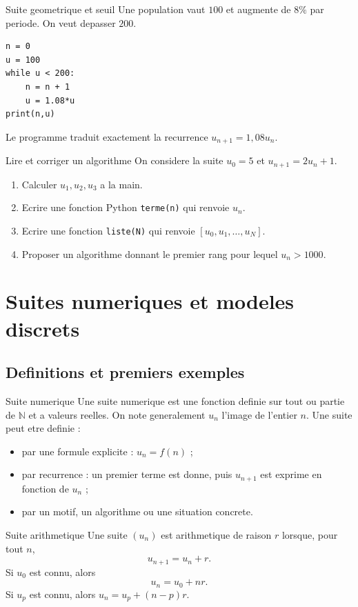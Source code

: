 \documentclass[11pt,a4paper]{article}
\newcounter{corrige}
\newcommand{\N}{\mathbb{N}}
\begin{document}
\begin{boiteexemple}{Suite geometrique et seuil}
Une population vaut $100$ et augmente de $8\%$ par periode. On veut depasser $200$.
\begin{verbatim}
n = 0
u = 100
while u < 200:
    n = n + 1
    u = 1.08*u
print(n,u)
\end{verbatim}
Le programme traduit exactement la recurrence $u_{n+1}=1,08u_n$.
\end{boiteexemple}

\begin{exobox}{Lire et corriger un algorithme}
On considere la suite $u_0=5$ et $u_{n+1}=2u_n+1$.
\begin{enumerate}
  \item Calculer $u_1,u_2,u_3$ a la main.
  \item Ecrire une fonction Python \texttt{terme(n)} qui renvoie $u_n$.
  \item Ecrire une fonction \texttt{liste(N)} qui renvoie $[u_0,u_1,\dots,u_N]$.
  \item Proposer un algorithme donnant le premier rang pour lequel $u_n>1000$.
\end{enumerate}
\end{exobox}


\section{Suites numeriques et modeles discrets}

\subsection{Definitions et premiers exemples}
\begin{boitecours}{Suite numerique}
Une suite numerique est une fonction definie sur tout ou partie de $\N$ et a valeurs reelles. On note generalement $u_n$ l'image de l'entier $n$. Une suite peut etre definie :
\begin{itemize}
  \item par une formule explicite : $u_n=f(n)$ ;
  \item par recurrence : un premier terme est donne, puis $u_{n+1}$ est exprime en fonction de $u_n$ ;
  \item par un motif, un algorithme ou une situation concrete.
\end{itemize}
\end{boitecours}

\begin{boitecours}{Suite arithmetique}
Une suite $(u_n)$ est arithmetique de raison $r$ lorsque, pour tout $n$,
\[
u_{n+1}=u_n+r.
\]
Si $u_0$ est connu, alors
\[
u_n=u_0+nr.
\]
Si $u_p$ est connu, alors $u_n=u_p+(n-p)r$.
\end{boitecours}
\end{document}
